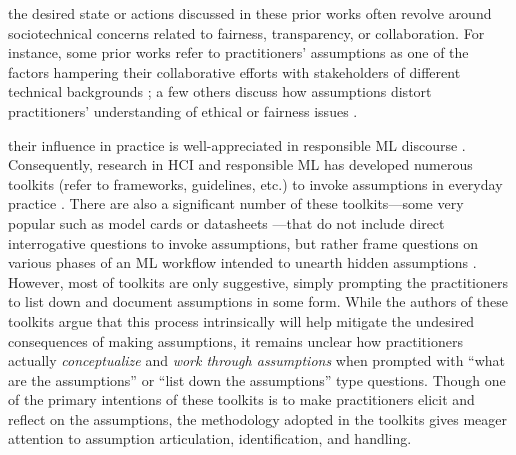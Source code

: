  the desired state or actions discussed in these prior works often revolve around sociotechnical concerns related to fairness, transparency, or collaboration. For instance, some prior works refer to practitioners' assumptions as one of the factors hampering their collaborative efforts with stakeholders of different technical backgrounds \cite{yang2018investigating,varanasi2023currently,wang2023designing}; a few others discuss how assumptions distort practitioners' understanding of ethical or fairness issues \cite{boyd2021datasheets,dengExploringHowMachine2022,aragon2022human,jarrahi2022principles}. 

their influence in practice is well-appreciated in responsible ML discourse \cite{mitchell2021algorithmic,jarrahi2022principles,aragon2022human,malik2020hierarchy}. 
Consequently, research in HCI and responsible ML has developed numerous toolkits \cite{wong2023seeing} (refer to frameworks, guidelines, etc.) to invoke assumptions in everyday practice . There are also a significant number of these toolkits---some very popular such as model cards \cite{mitchellModelCardsModel2019} or datasheets \cite{gebruDatasheetsDatasets2021}---that do not include direct interrogative questions to invoke assumptions, but rather frame questions on various phases of an ML workflow intended to unearth hidden assumptions . 
However, most of  toolkits  are only suggestive, simply prompting the practitioners to list down and document assumptions in some form. While the authors of these toolkits argue that this process intrinsically will help mitigate the undesired consequences of making assumptions, it remains unclear how practitioners actually \textit{conceptualize} and \textit{work through assumptions} when prompted with ``what are the assumptions'' or ``list down the assumptions'' type questions. Though one of the primary intentions of these toolkits is to make practitioners elicit and reflect on the assumptions, the methodology adopted in the toolkits gives meager attention to  assumption articulation, identification, and handling. 

